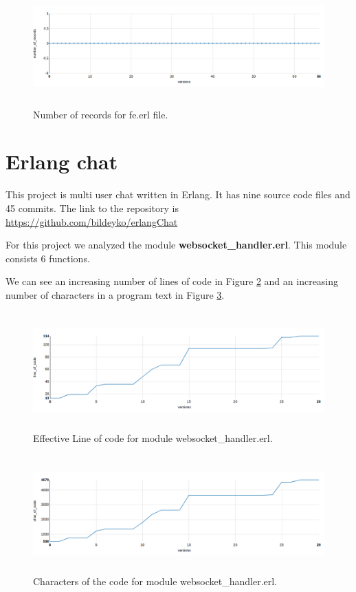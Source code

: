 \begin{figure}[h]
	\centering
	\includegraphics[height=45mm]{figures/number_of_records_iron.png}
	\caption{Number of records for fe.erl file.}
	\label{fig:number_of_records_iron}
\end{figure}

\section{Erlang chat }

This project is multi user chat written in Erlang. It has nine source code files and 45 commits. The link to the repository is \url{https://github.com/bildeyko/erlangChat}

For this project we analyzed the module \textbf{websocket\_handler.erl}. This module consists 6 functions.

We can see an increasing number of lines of code in Figure \ref{fig:loc_chat} and an increasing number of characters in a program text in Figure \ref{fig:char_of_code_chat}.

\begin{figure}[h]
	\centering
	\includegraphics[height=45mm]{figures/loc_chat.png}
	\caption{Effective Line of code for module websocket\_handler.erl.}
	\label{fig:loc_chat}
\end{figure}

\begin{figure}[h]
	\centering
	\includegraphics[height=45mm]{figures/char_of_code_chat.png}
	\caption{Characters of the code for module websocket\_handler.erl.}
	\label{fig:char_of_code_chat}
\end{figure}

